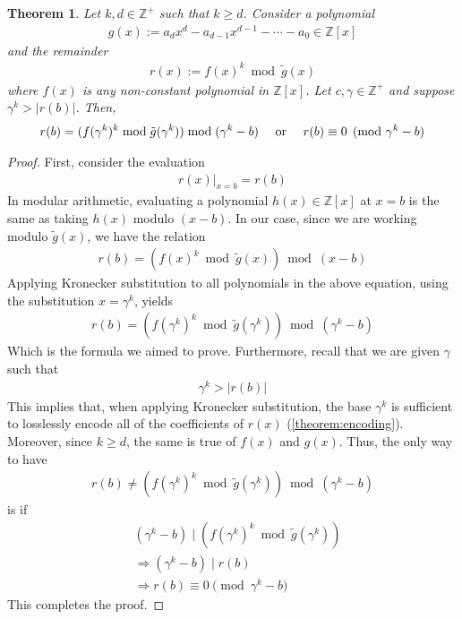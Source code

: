 \documentclass[11pt,reqno]{article}
\theoremstyle{plain}
\newtheorem{theorem}{Theorem}
\theoremstyle{definition}
\newcommand{\eval}[2]{\left . #1 \right|_{#2}}
\begin{document}
\begin{theorem} \label{theorem:kroneckerqrings}
Let $k, d \in \mathbb{Z}^+$ such that $k \geq d$. Consider a polynomial
\begin{align*}
g(x) := a_d x^d - a_{d-1} x^{d-1} - \cdots - a_0 \in \mathbb{Z}[x]
\end{align*}
and the remainder
\begin{align*}
r(x) := f(x)^k  \bmod{\tilde{g}(x)}
\end{align*}
where $f(x)$ is any non-constant polynomial in $\mathbb{Z}[x]$. Let $c, \gamma \in \mathbb{Z}^+$ and suppose $\gamma^k > |r(b)|$. Then,
\begin{align*}
r(b) = (f(\gamma^k)^k \bmod{\tilde{g}(\gamma^k)}) \bmod{(\gamma^k - b)}
\quad \textup{ or }
\quad r(b) \equiv 0 \pmod{\gamma^k - b}
\end{align*}
\end{theorem}
\begin{proof}
First, consider the evaluation 
\begin{align*}
    \eval{r(x)}{x=b} = r(b)
\end{align*}
In modular arithmetic, evaluating a polynomial $h(x) \in \mathbb{Z}[x]$ at $x=b$ is the same as taking $h(x)$ modulo $(x - b)$. In our case, since we are working modulo $\tilde{g}(x)$, we have the relation
\begin{align*}
    r(b) = (f(x)^k \bmod{\tilde{g}(x)}) \bmod{(x - b)}
\end{align*}
Applying Kronecker substitution to all polynomials in the above equation, using the substitution $x = \gamma^k$, yields
\begin{align*}
    r(b) = (f(\gamma^k)^k \bmod{\tilde{g}(\gamma^k)}) \bmod{(\gamma^k - b)}
\end{align*}
Which is the formula we aimed to prove. Furthermore, recall that we are given $\gamma$ such that
\begin{align*}
    \gamma^k > |r(b)|
\end{align*}
This implies that, when applying Kronecker substitution, the base $\gamma^k$ is sufficient to losslessly encode all of the coefficients of $r(x)$ (\cref{theorem:encoding}). Moreover, since $k \geq d$, the same is true of $f(x)$ and $g(x)$. Thus, the only way to have
\begin{align*}
    r(b) \not= (f(\gamma^k)^k \bmod{\tilde{g}(\gamma^k)}) \bmod{(\gamma^k - b)}
\end{align*}
is if
\begin{align*}
    & (\gamma^k - b) \mid (f(\gamma^k)^k \bmod{\tilde{g}(\gamma^k)}) \\
    & \Longrightarrow (\gamma^k - b) \mid r(b) \\
    & \Longrightarrow r(b) \equiv 0 \pmod{\gamma^k - b}
\end{align*}
This completes the proof.
\end{proof}
\end{document}
